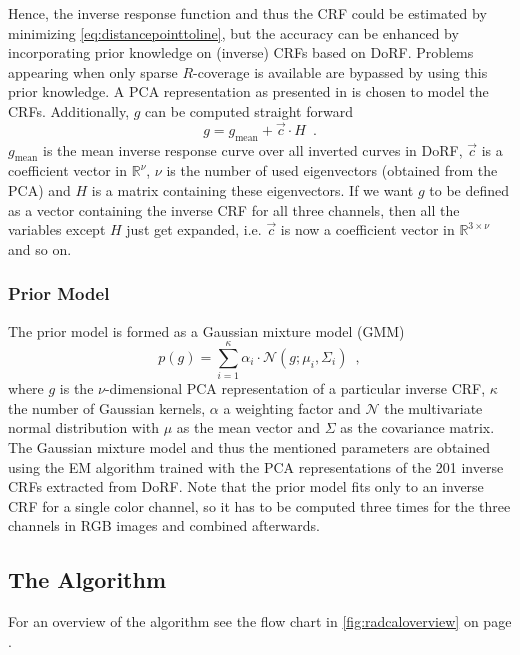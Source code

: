 Hence, the inverse response function and thus the CRF could be estimated by minimizing \autoref{eq:distancepointtoline}, but the accuracy can be enhanced by incorporating prior knowledge on (inverse) CRFs based on DoRF. Problems appearing when only sparse $R$-coverage is available are bypassed by using this prior knowledge. A PCA representation as presented in \cite{CAVE_0091} is chosen to model the CRFs. Additionally, $g$ can be computed straight forward
\begin{equation}
	g = g_{\text{mean}} + \vec{c} \cdot H \enspace .
	\label{eq:crfconcisedescriptorPCA}
\end{equation}
$g_{\text{mean}}$ is the mean inverse response curve over all inverted curves in DoRF, $\vec{c}$ is a coefficient vector in $\mathbb{R}^{\nu}$, $\nu$ is the number of used eigenvectors (obtained from the PCA) and $H$ is a matrix containing these eigenvectors. If we want $g$ to be defined as a vector containing the inverse CRF for all three channels, then all the variables except $H$ just get expanded, \hbox{i.e.} $\vec{c}$ is now a coefficient vector in $\mathbb{R}^{3 \times \nu}$ and so on.


\clearpage

\subsubsection{Prior Model}
\label{subsubsec:priormodel}
The prior model is formed as a Gaussian mixture model (GMM)
\begin{equation}
	p(g) = \sum\limits_{i=1}^\kappa \alpha_i \cdot \mathcal{N}(g; \mu_i, \Sigma_i) \enspace ,
	\label{eq:priormodel}
\end{equation}
where $g$ is the $\nu$-dimensional PCA representation of a particular inverse CRF, $\kappa$ the number of Gaussian kernels, $\alpha$ a weighting factor and $\mathcal{N}$ the multivariate normal distribution with $\mu$ as the mean vector and $\Sigma$ as the covariance matrix. The Gaussian mixture model and thus the mentioned parameters are obtained using the EM algorithm trained with the PCA representations of the 201 inverse CRFs extracted from DoRF. Note that the prior model fits only to an inverse CRF for a single color channel, so it has to be computed three times for the three channels in RGB images and combined afterwards. 


\clearpage

\subsection{The Algorithm}
\label{subsec:radcalalgo}
For an overview of the algorithm see the flow chart in \autoref{fig:radcaloverview} on page \pageref{fig:radcaloverview}.

